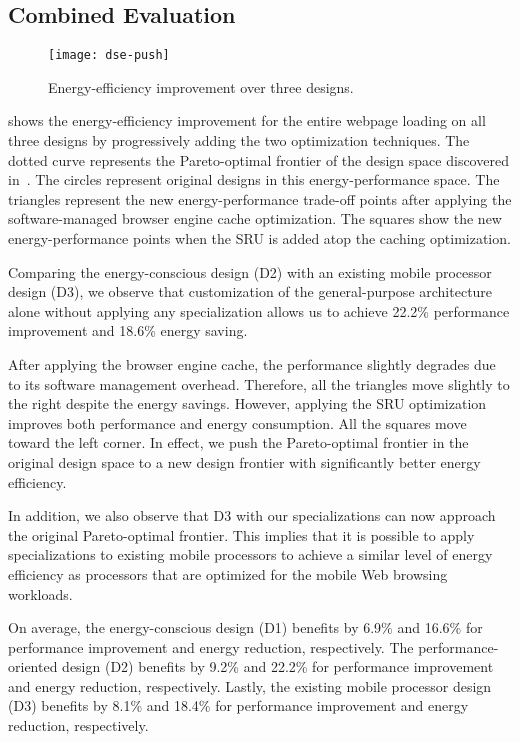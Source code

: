 \subsection{Combined Evaluation}
\label{sec:arch:eval:comb}

\begin{figure}[t]
\centering
\texttt{[image: dse-push]}
\caption{Energy-efficiency improvement over three designs.}
\label{fig:dse-push}
\end{figure}

 shows the energy-efficiency improvement for the entire webpage loading on all three designs by progressively adding the two optimization techniques. The dotted curve represents the Pareto-optimal frontier of the design space discovered in~. The circles represent original designs in this energy-performance space. The triangles represent the new energy-performance trade-off points after applying the software-managed browser engine cache optimization. The squares show the new energy-performance points when the SRU is added atop the caching optimization.

Comparing the energy-conscious design (D2) with an existing mobile processor design (D3), we observe that customization of the general-purpose architecture alone without applying any specialization allows us to achieve 22.2\% performance improvement and 18.6\% energy saving.

After applying the browser engine cache, the performance slightly degrades due to its software management overhead. Therefore, all the triangles move slightly to the right despite the energy savings. However, applying the SRU optimization improves both performance and energy consumption. All the squares move toward the left corner. In effect, we push the Pareto-optimal frontier in the original design space to a new design frontier with significantly better energy efficiency.

In addition, we also observe that D3 with our specializations can now approach the original Pareto-optimal frontier. This implies that it is possible to apply specializations to existing mobile processors to achieve a similar level of energy efficiency as processors that are optimized for the mobile Web browsing workloads.

On average, the energy-conscious design (D1) benefits by 6.9\% and 16.6\% for performance improvement and energy reduction, respectively. The performance-oriented design (D2) benefits by 9.2\% and 22.2\% for performance improvement and energy reduction, respectively. Lastly, the existing mobile processor design (D3) benefits by 8.1\% and 18.4\% for performance improvement and energy reduction, respectively.

